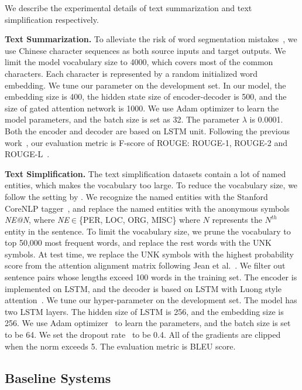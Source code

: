 \documentclass{clv3}
\begin{document}
\begin{CJK*}{UTF8}{gbsn}
We describe the experimental details of text summarization and text simplification respectively.

\noindent\textbf{Text Summarization.} To alleviate the risk of word segmentation mistakes~\cite{Xu2016Dependency,SunEA2012}, we use Chinese character sequences as both source inputs and target outputs. We limit the model vocabulary size to 4000, which covers most of the common characters. Each character is represented by a random initialized word embedding. We tune our parameter on the development set. In our model, the embedding size is 400, the hidden state size of encoder-decoder is 500, and the size of gated attention network is 1000. We use Adam optimizer to learn the model parameters, and the batch size is set as 32. The parameter $\lambda$ is 0.0001. Both the encoder and decoder are based on LSTM unit. Following the previous work~\cite{lcsts}, our evaluation metric is F-score of ROUGE: ROUGE-1, ROUGE-2 and ROUGE-L~\cite{rough}.

\noindent\textbf{Text Simplification.} The text simplification datasets contain a lot of named entities, which makes the vocabulary too large. To reduce the vocabulary size, we follow the setting by . We recognize the named entities with the Stanford CoreNLP tagger~\cite{ManningEA2014}, and replace the named entities with the anonymous symbols \emph{NE@N}, where \emph{NE}$\in$\{PER, LOC, ORG, MISC\} where $N$ represents the $N^{th}$ entity in the sentence. To limit the vocabulary size, we prune the vocabulary to top 50,000 most frequent words, and replace the rest words with the UNK symbols. At test time, we replace the UNK symbols with the highest probability score from the attention alignment matrix following Jean et al.~\cite{mapattention}. We filter out sentence pairs whose lengths exceed 100 words in the training set. The encoder is implemented on LSTM, and the decoder is based on LSTM with Luong style attention~\cite{stanfordattention}. We tune our hyper-parameter on the development set. The model has two LSTM layers. The hidden size of LSTM is 256, and the embedding size is 256. We use Adam optimizer~\cite{KingmaBa2014} to learn the parameters, and the batch size is set to be 64. We set the dropout rate~\cite{dropout} to be 0.4. All of the gradients are clipped when the norm exceeds 5. The evaluation metric is BLEU score.


\subsection{Baseline Systems}


\end{CJK*}
\end{document}
